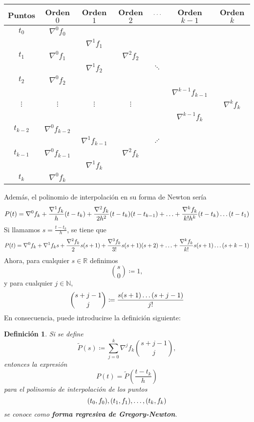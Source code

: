 \documentclass[11pt]{report}
\theoremstyle{mytheorem}
\theoremstyle{mydefinition}
\newtheorem{definition}{Definición}
\theoremstyle{myexample}
\newenvironment{cdefinition} %
  {\begin{mdframed}[
        linewidth=3pt,
        linecolor=c1,
        bottomline=false,
        topline=false,
        rightline=false,
        innerrightmargin=0pt,
        innertopmargin=0pt,
        innerbottommargin=0pt,
        innerleftmargin=1em, %
        skipabove=\baselineskip]
    \begin{definition}}
  {\end{definition}\end{mdframed}}
\newcommand{\R}{\mathbb R}
\newcommand{\N}{\mathbb N}
\newcommand{\mybf}[1]{\boldmath\textbf{\color{c1}#1}\unboldmath}
\begin{document}
\vspace{0.5\baselineskip}

\begin{center}
\begin{tabular}{|c|c|c|c|c|c|c|}
    \hline
    Puntos & Orden $0$ & Orden $1$ & Orden $2$ & $\mathellipsis$ & Orden $k-1$ & Orden $k$ \\ \hline
    $t_0$ & $\nabla^0f_0$ & & & & & \\
    & & $\nabla^1f_1$ & & & & \\
    $t_1$ & $\nabla^0f_1$ & & $\nabla^2f_2$ & & & \\
    & & $\nabla^1f_2$ & &  $\ddots$ & & \\
    $t_2$ & $\nabla^0f_2$ & & & & & \\
    & & & & & $\nabla^{k-1}f_{k-1}$ & \\
    $\vdots$ & $\vdots$ & $\vdots$ & $\vdots$ & & & $\nabla^kf_k$ \\
    & & & & & $\nabla^{k-1}f_k$ & \\
    $t_{k-2}$ & $\nabla^0f_{k-2}$ & & & & & \\
    & & $\nabla^1f_{k-1}$ & & $\iddots$ &  &\\
    $t_{k-1}$ & $\nabla^0f_{k-1}$ & & $\nabla^2f_k$ & & & \\
    & & $\nabla^1f_k$ & & & & \\
    $t_k$ & $\nabla^0f_k$ & & & & & \\ \hline
\end{tabular}
\end{center}

\vspace{0.5\baselineskip}

Además, el polinomio de interpolación en su forma de Newton sería
\[P(t) = \nabla^0f_k+\frac{\nabla^1f_k}{h}(t-t_k)+\frac{\nabla^2f_k}{2h^2}(t-t_k)(t-t_{k-1})+\mathellipsis+\frac{\nabla^kf_k}{k!h^k}(t-t_k)\mathellipsis(t-t_1)\]
Si llamamos $s = \frac{t-t_k}{h}$, se tiene que 
\[P(t) = \nabla^0f_k+\nabla^1f_ks+\frac{\nabla^2f_k}{2}s(s+1)+\frac{\nabla^3f_k}{3!}s(s+1)(s+2)+\mathellipsis+\frac{\nabla^kf_k}{k!}s(s+1)\mathellipsis(s+k-1)\]
Ahora, para cualquier $s \in \R$ definimos
\[\binom{s}{0} \coloneqq 1,\]
y para cualquier $j \in \N$,
\[\binom{s+j-1}{j} \coloneqq \frac{s(s+1)\mathellipsis(s+j-1)}{j!}\]
En consecuencia, puede introducirse la definición siguiente:


\begin{cdefinition}
Si se define
\[\widetilde{P}(s)\coloneqq\sum_{j=0}^k \nabla^jf_k\binom{s+j-1}{j},\]
entonces la expresión
\[P(t) = \widetilde{P}\left(\frac{t-t_k}{h}\right)\]
para el polinomio de interpolación de los puntos \[(t_0,f_0),(t_1,f_1),\mathellipsis,(t_k,f_k)\] se conoce como \mybf{forma regresiva de Gregory-Newton}.
\end{cdefinition}
\end{document}
